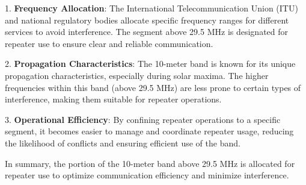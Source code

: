 1. \textbf{Frequency Allocation}: The International Telecommunication Union (ITU) and national regulatory bodies allocate specific frequency ranges for different services to avoid interference. The segment above 29.5 MHz is designated for repeater use to ensure clear and reliable communication.

2. \textbf{Propagation Characteristics}: The 10-meter band is known for its unique propagation characteristics, especially during solar maxima. The higher frequencies within this band (above 29.5 MHz) are less prone to certain types of interference, making them suitable for repeater operations.

3. \textbf{Operational Efficiency}: By confining repeater operations to a specific segment, it becomes easier to manage and coordinate repeater usage, reducing the likelihood of conflicts and ensuring efficient use of the band.

In summary, the portion of the 10-meter band above 29.5 MHz is allocated for repeater use to optimize communication efficiency and minimize interference.


